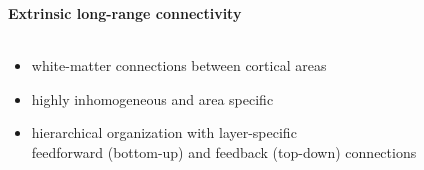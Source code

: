 \documentclass[8pt,t,usepdftitle=false]{beamer}
\def\figpath{\src/figures}
\begin{document}
\begin{frame}[plain]
  \frametitle{\ttl}
  \framesubtitle{Extrinsic long-range connectivity}
  \vspace*{-2ex}
  \begin{columns}
    \begin{column}{0.6\linewidth}
      \begin{itemize}\itemsep1ex
      \item<1-> white-matter connections between cortical areas
      \item<2-> highly inhomogeneous and area specific
      \item<3-> hierarchical organization with layer-specific \\feedforward (bottom-up) and feedback (top-down) connections
      \end{itemize}      
    \end{column}
    \begin{column}{0.4\linewidth}
    \end{column}
  \end{columns}
\end{frame}
\def\ttl{Universality of neocortical architecture}
\end{document}
